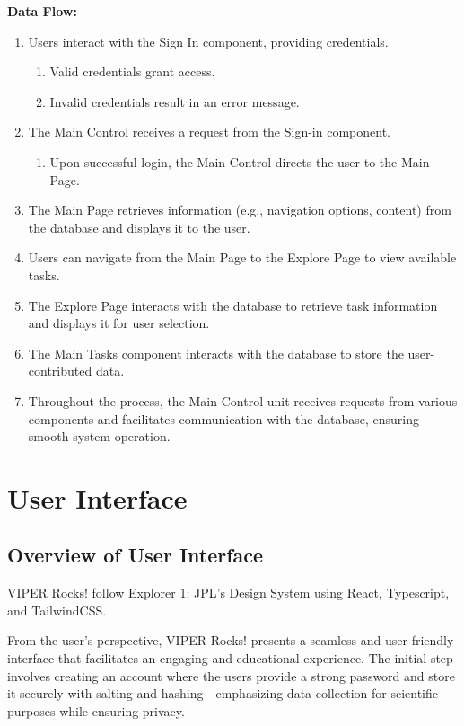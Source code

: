 \documentclass{article}
\begin{document}
\textbf{Data Flow:}
\begin{enumerate}
\item Users interact with the Sign In component, providing credentials.
	\begin{enumerate}[label=(\alph*)]
		\item Valid credentials grant access.
		\item Invalid credentials result in an error message.
	\end{enumerate}
\item The Main Control receives a request from the Sign-in component.
	\begin{enumerate}[label=(\alph*)]
		\item Upon successful login, the Main Control directs the user to the Main Page.
	\end{enumerate}
\item The Main Page retrieves information (e.g., navigation options, content) from the
database and displays it to the user.
\item Users can navigate from the Main Page to the Explore Page to view available tasks.
\item The Explore Page interacts with the database to retrieve task information and displays it
for user selection.
\item The Main Tasks component interacts with the database to store the user-contributed data.
\item Throughout the process, the Main Control unit receives requests from various components and facilitates communication with the database, ensuring smooth system operation.
\end{enumerate}
\section{User Interface}

\subsection{Overview of User Interface}
VIPER Rocks! follow Explorer 1: JPL’s Design System using React, Typescript, and TailwindCSS.

From the user’s perspective, VIPER Rocks! presents a seamless and user-friendly interface that facilitates an engaging and educational experience. The initial step involves creating an account where the users provide a strong password and store it securely with salting and hashing—emphasizing data collection for scientific purposes while ensuring privacy.
\end{document}
